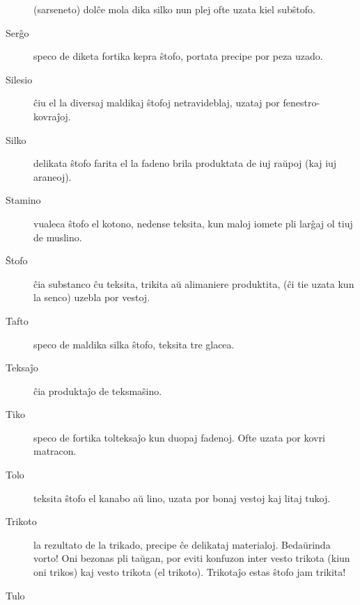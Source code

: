 \begin{description}
 (sarseneto) dolĉe mola dika silko nun plej ofte uzata kiel subŝtofo.

\item[Serĝo]

 speco de diketa fortika kepra ŝtofo, portata precipe por peza uzado.

\item[\dagger\space Silesio]

 ĉiu el la diversaj maldikaj ŝtofoj netravideblaj, uzataj por fenestro-kovraĵoj.

\item[Silko]

 delikata ŝtofo farita el la fadeno brila produktata de iuj raŭpoj (kaj iuj araneoj).

\item[Stamino]

 vualeca ŝtofo el kotono, nedense teksita, kun maloj iomete pli larĝaj ol tiuj de muslino.

\item[Ŝtofo]

 ĉia substanco ĉu teksita, trikita aŭ alimaniere produktita, (ĉi tie uzata kun la senco) uzebla por vestoj.

\item[Tafto]

 speco de maldika silka ŝtofo, teksita tre glacea.

\item[Teksaĵo]

 ĉia produktaĵo de teksmaŝino.

\item[Tiko]

 speco de fortika tolteksaĵo kun duopaj fadenoj. Ofte uzata por kovri matracon.

\item[Tolo]

 teksita ŝtofo el kanabo aŭ lino, uzata por bonaj vestoj kaj litaj tukoj.

\item[Trikoto]

 la rezultato de la trikado, precipe ĉe delikataj materialoj. Bedaŭrinda vorto! Oni bezonas pli taŭgan, por eviti konfuzon inter vesto trikota (kiun oni trikos) kaj vesto trikota (el trikoto). Trikotaĵo estas ŝtofo jam trikita!

\item[Tulo]


\end{description}
